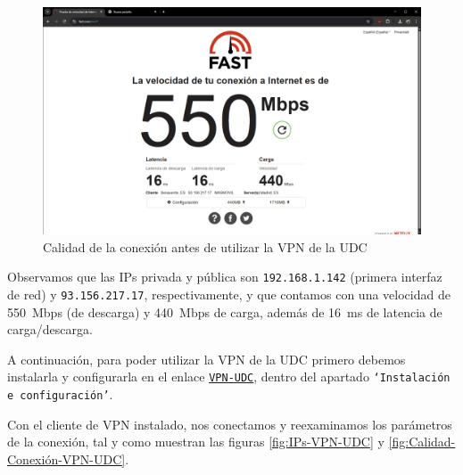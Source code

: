 \begin{figure}[H]
    \centering
    \includegraphics[width=\linewidth]{CalidadConexion-preUDC.png}
    \caption{Calidad de la conexión antes de utilizar la VPN de la UDC}
    \label{fig:Calidad-Conexión-preUDC}
\end{figure}


Observamos que las IPs privada y pública son \texttt{192.168.1.142} (primera interfaz de red) y \texttt{93.156.217.17}, respectivamente, y que contamos con una velocidad de \SI{550}{Mbps} (de descarga) y \SI{440}{Mbps} de carga, además de \SI{16}{ms} de latencia de carga/descarga.

A continuación, para poder utilizar la VPN de la UDC primero debemos instalarla y configurarla en el enlace \href{https://axudatic.udc.gal/pages/viewpage.action?pageId=45813771}{\texttt{VPN-UDC}}, dentro del apartado \texttt{`Instalación e configuración'}.

Con el cliente de VPN instalado, nos conectamos y reexaminamos los parámetros de la conexión, tal y como muestran las figuras \ref{fig:IPs-VPN-UDC} y \ref{fig:Calidad-Conexión-VPN-UDC}.

